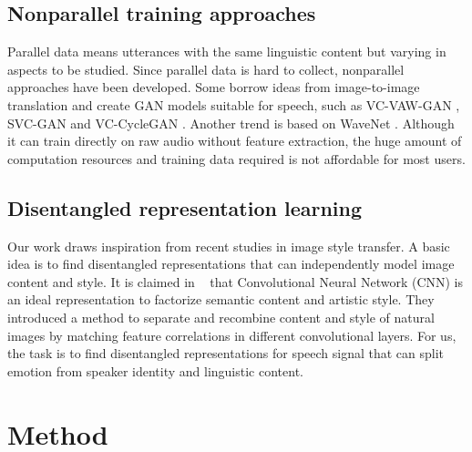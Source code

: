 \documentclass{article}
\begin{document}
\subsection{Nonparallel training approaches}
Parallel data means utterances with the same linguistic content but varying in aspects to be studied. Since parallel data is hard to collect, nonparallel approaches have been developed. Some borrow ideas from image-to-image translation \cite{NIPS2017_6672} and create GAN models \cite{goodfellow2014generative} suitable for speech, such as VC-VAW-GAN \cite{Hsu2017}, SVC-GAN \cite{Kaneko2017} and VC-CycleGAN \cite{fang2018high}. Another trend is based on WaveNet \cite{van2016wavenet,tamamori2017speaker}. Although it can train directly on raw audio without feature extraction, the huge amount of computation resources and training data required is not affordable for most users.


\subsection{Disentangled representation learning}
Our work draws inspiration from recent studies in image style transfer. A basic idea is to find disentangled representations that can independently model image content and style. It is claimed in ~\cite{gatys2016image} that Convolutional Neural Network (CNN) is an ideal representation to factorize semantic content and artistic style. They introduced a method to separate and recombine content and style of natural images by matching feature correlations in different convolutional layers. For us, the task is to find disentangled representations for speech signal that can split emotion from speaker identity and linguistic content.



\section{Method}
\label{sec:method}
\end{document}
